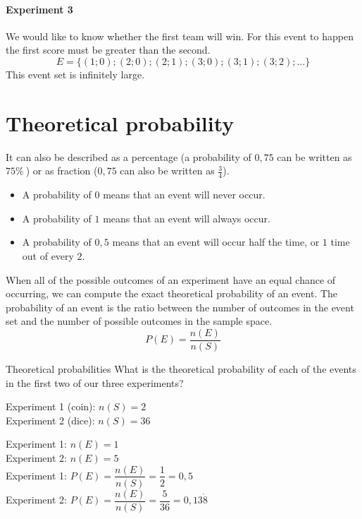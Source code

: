 
\paragraph{Experiment 3} We would like to know whether the first team
will win. For this event to happen the first score must be greater
than the second.
\[E=\{(1;0);(2;0);(2;1);(3;0);(3;1);(3;2);\ldots\}\]
This event set is infinitely large.


\section{Theoretical probability}
\par
It can also be described as a percentage (a probability of $0,75$ can be written as $75 \%~$) or as fraction ($0,75$ can also be written as $\frac{3}{4}$).
\begin{itemize}
\item A probability of $0$ means that an event will never occur.
\item A probability of $1$ means that an event will always occur.
\item A probability of $0,5$ means that an event will occur half the
  time, or $1$ time out of every $2$.
\end{itemize}

When all of the possible outcomes of an experiment have an equal
chance of occurring, we can compute the exact theoretical probability
of an event. The probability of an event is the ratio between the
number of outcomes in the event set and the number of possible
outcomes in the sample space.
\[P(E) = \frac{n(E)}{n(S)}\]


\begin{wex}{Theoretical probabilities}
{What is the theoretical probability of each of the events in the
  first two of our three experiments?}
{

  Experiment 1 (coin): $n(S) = 2$\\
  Experiment 2 (dice): $n(S) = 36$\\


 
   Experiment 1: $n(E) = 1$\\
   Experiment 2: $n(E) = 5$\\


Experiment 1: $P(E) = \dfrac{n(E)}{n(S)} = \dfrac{1}{2} = 0,5$\\[5pt]
Experiment 2: $P(E) = \dfrac{n(E)}{n(S)} = \dfrac{5}{36} = 0,13\dot{8}$\\

}
\end{wex}

